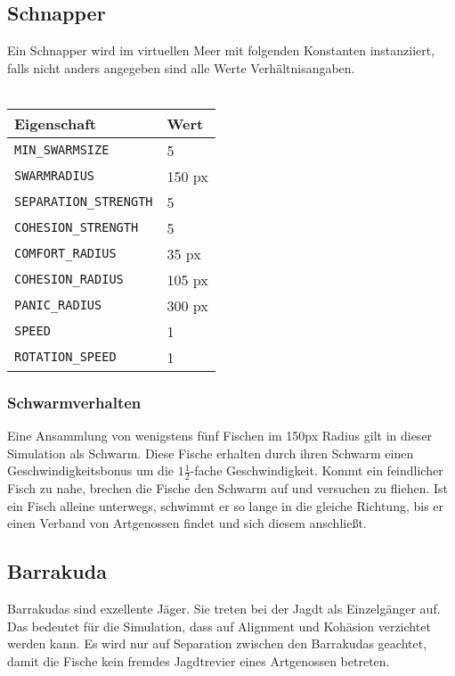 \documentclass[11pt]{article}
\begin{document}
\subsection{Schnapper}
Ein Schnapper wird im virtuellen Meer mit folgenden Konstanten instanziiert, falls nicht anders angegeben sind alle Werte Verhältnisangaben. \\\\
\begin{tabular}{|l|l|}
\hline
	\textbf{Eigenschaft} & \textbf{Wert}\\
\hline
\hline
	\lstinline[]$MIN_SWARMSIZE$  & 5\\
\hline
	\lstinline[]$SWARMRADIUS$ & 150 px\\
\hline
	\lstinline[]$SEPARATION_STRENGTH$ & 5\\
\hline
	\lstinline[]$COHESION_STRENGTH$ & 5\\
\hline
	\lstinline[]$COMFORT_RADIUS$ & 35 px\\
\hline
	\lstinline[]$COHESION_RADIUS$ & 105 px\\
\hline
	\lstinline[]$PANIC_RADIUS$ & 300 px\\
\hline
	\lstinline[]$SPEED$ & 1\\
\hline
	\lstinline[]$ROTATION_SPEED$ & 1\\
\hline
\end{tabular}

\subsubsection{Schwarmverhalten}
Eine Ansammlung von wenigstens fünf Fischen im 150px Radius gilt in dieser Simulation als Schwarm. Diese Fische erhalten durch ihren Schwarm einen Geschwindigkeitsbonus um die \( 1 \frac{1}{2} \)-fache Geschwindigkeit.
Kommt ein feindlicher Fisch zu nahe, brechen die Fische den Schwarm auf und versuchen zu fliehen. Ist ein Fisch alleine unterwegs, schwimmt er so lange in die gleiche Richtung, bis er einen Verband von Artgenossen findet und sich diesem anschließt.

\subsection{Barrakuda}
Barrakudas sind exzellente Jäger. Sie treten bei der Jagdt als Einzelgänger auf. Das bedeutet für die Simulation, dass auf Alignment und Kohäsion verzichtet werden kann. Es wird nur auf Separation zwischen den Barrakudas geachtet, damit die Fische kein fremdes Jagdtrevier eines Artgenossen betreten.\\
\end{document}
